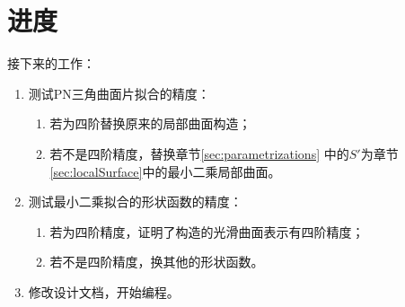 
\section{进度}
接下来的工作：
\begin{enumerate}
\item 测试PN三角曲面片拟合的精度：
  \begin{enumerate}
  \item 若为四阶替换原来的局部曲面构造；
  \item 若不是四阶精度，替换章节\ref{sec:parametrizations}
    中的$S'$为章节\ref{sec:localSurface}中的最小二乘局部曲面。
  \end{enumerate}
\item 测试最小二乘拟合的形状函数的精度：
  \begin{enumerate}
  \item 若为四阶精度，证明了构造的光滑曲面表示有四阶精度；
  \item 若不是四阶精度，换其他的形状函数。
  \end{enumerate}
\item 修改设计文档，开始编程。
\end{enumerate}


